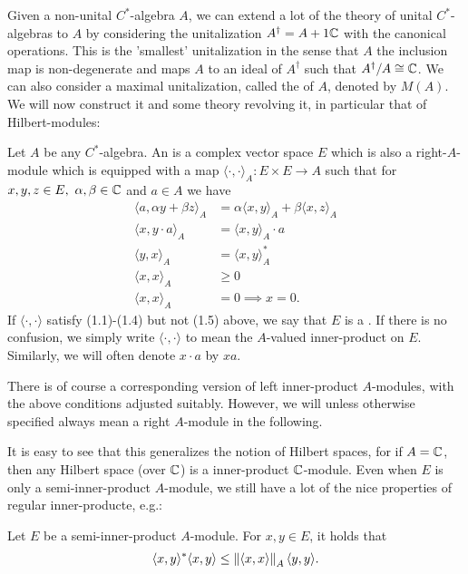 Given a non-unital $C^*$-algebra $A$, we can extend a lot of the theory of unital $C^*$-algebras to $A$ by considering the unitalization $A^\dagger = A + 1\mathbb{C}$ with the canonical operations. This is the 'smallest' unitalization in the sense that $A$ the inclusion map is non-degenerate and maps $A$ to an ideal of $A^\dagger$ such that $A^\dagger/A \cong \mathbb{C}$. We can also consider a maximal unitalization, called the  of $A$, denoted by $M(A)$. We will now construct it and some theory revolving it, in particular that of Hilbert-modules:
\begin{definition}
	Let $A$ be any $C^*$-algebra. An  is a complex vector space $E$ which is also a right-$A$-module which is equipped with a map $\langle \cdot, \cdot\rangle_A \colon E \times E \to A$ such that for $x,y,z \in E, \ \alpha,\beta \in \mathbb{C}$ and $a \in A$ we have
	\begin{align}
		\langle a , \alpha y + \beta z \rangle_A &= \alpha \langle x,y\rangle_A+\beta \langle x,z \rangle_A\\
		\langle x , y \cdot a \rangle_{A} &= \langle x,y\rangle_A \cdot a\\
		\langle y,x \rangle_A &= \langle x,y\rangle_A^*\\
		\langle x,x \rangle_A &\geq 0\\
		\langle x,x \rangle_A &= 0 \implies x = 0. 
	\end{align}
	If $\langle \cdot , \cdot \rangle$ satisfy (1.1)-(1.4) but not (1.5) above, we say that $E$ is a . If there is no confusion, we simply write $\langle \cdot, \cdot \rangle$ to mean the $A$-valued inner-product on $E$. Similarly, we will often denote $x \cdot a$ by $xa$. 

	There is of course a corresponding version of left inner-product $A$-modules, with the above conditions adjusted suitably. However, we will unless otherwise specified always mean a right $A$-module in the following.
	\label{mult:defmod}
\end{definition}
It is easy to see that this generalizes the notion of Hilbert spaces, for if $A= \mathbb{C}$, then any Hilbert space (over $\mathbb{C}$) is a inner-product $\mathbb{C}$-module. Even when $E$ is only a semi-inner-product $A$-module, we still have a lot of the nice properties of regular inner-producte, e.g.:
\begin{proposition}
Let $E$ be a semi-inner-product $A$-module. For $x,y \in E$, it holds that
\begin{align*}
	\langle x,y\rangle^* \langle x,y \rangle \leq \left\lVert \langle x , x \rangle \right\rVert_A \langle y , y \rangle.
\end{align*}
\end{proposition}
